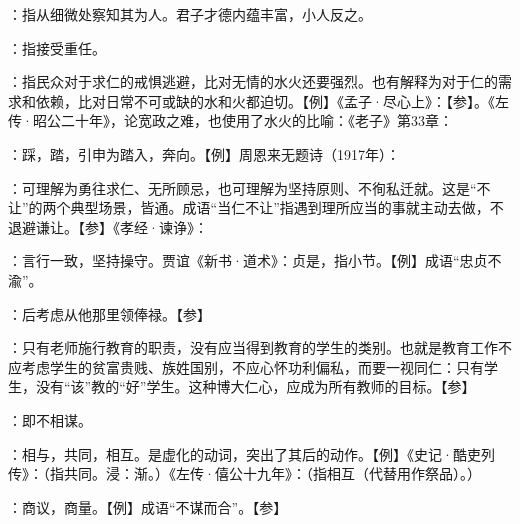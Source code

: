 {
\item {}：指从细微处察知其为人。君子才德内蕴丰富，小人反之。
\item {}：指接受重任。
}
{}


{
\item {}：指民众对于求仁的戒惧逃避，比对无情的水火还要强烈。也有解释为对于仁的需求和依赖，比对日常不可或缺的水和火都迫切。【例】《孟子·尽心上》：【参】。《左传·昭公二十年》，论宽政之难，也使用了水火的比喻：《老子》第33章：
\item {}：踩，踏，引申为踏入，奔向。【例】周恩来无题诗（1917年）：
}
{}  %


{
\item {}：可理解为勇往求仁、无所顾忌，也可理解为坚持原则、不徇私迁就。这是“不让”的两个典型场景，皆通。成语“当仁不让”指遇到理所应当的事就主动去做，不退避谦让。【参】《孝经·谏诤》：
}
{}


{
\item {}：言行一致，坚持操守。贾谊《新书·道术》：贞是，指小节。【例】成语“忠贞不渝”。
}
{}


{
\item {}：后考虑从他那里领俸禄。【参】
}
{}


{
\item {}：只有老师施行教育的职责，没有应当得到教育的学生的类别。也就是教育工作不应考虑学生的贫富贵贱、族姓国别，不应心怀功利偏私，而要一视同仁：只有学生，没有“该”教的“好”学生。这种博大仁心，应成为所有教师的目标。【参】 
}
{}  %


{
\item {}：即不相谋。

：相与，共同，相互。是虚化的动词，突出了其后的动作。【例】《史记·酷吏列传》：（指共同。浸：渐。）《左传·僖公十九年》：（指相互（代替用作祭品）。）

：商议，商量。【例】成语“不谋而合”。【参】
}
{}



